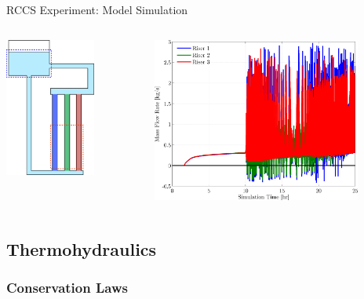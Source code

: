 \documentclass[10pt,t,xcolor=table]{beamer}
\begin{document}
    \begin{frame}[c]{RCCS Experiment: Model Simulation}
        \begin{columns}[c]
            \begin{column}{0.28\textwidth}
                \includegraphics[height=1.8in]{RCCSExperimentRiserPlotAid}
            \end{column}
            \begin{column}{0.65\textwidth}
                \includegraphics[width=2.7in,angle=0]{ExperimentMassFlowRateVsTime}
            \end{column}
        \end{columns}
    \end{frame}
    
    
\subsection{Thermohydraulics}
    \subsubsection*{Conservation Laws}
\end{document}
